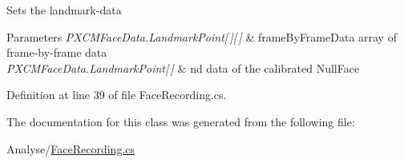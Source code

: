 Sets the landmark-\/data 
\begin{DoxyParams}{Parameters}
{\em P\+X\+C\+M\+Face\+Data.\+Landmark\+Point\mbox{[}$\,$\mbox{]}\mbox{[}$\,$\mbox{]}} & frame\+By\+Frame\+Data array of frame-\/by-\/frame data \\
\hline
{\em P\+X\+C\+M\+Face\+Data.\+Landmark\+Point\mbox{[}$\,$\mbox{]}} & nd data of the calibrated Null\+Face \\
\hline
\end{DoxyParams}


Definition at line 39 of file Face\+Recording.\+cs.



The documentation for this class was generated from the following file\+:\begin{DoxyCompactItemize}
\item 
Analyse/\hyperlink{_face_recording_8cs}{Face\+Recording.\+cs}\end{DoxyCompactItemize}
